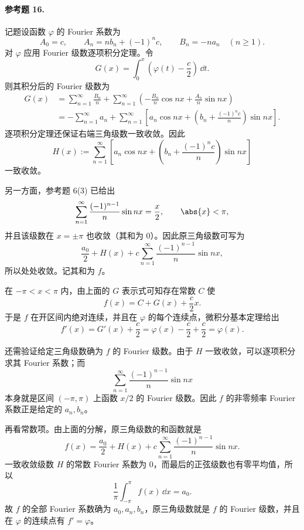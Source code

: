 \paragraph{参考题 16.}
\begin{xsolution}
记题设函数 $\varphi$ 的 Fourier 系数为
\[
  A_0=c,\qquad
  A_n=nb_n+(-1)^nc,\qquad
  B_n=-na_n\quad(n\ge1).
\]
对 $\varphi$ 应用 Fourier 级数逐项积分定理。令
\[
  G(x)=\int_0^x\left(\varphi(t)-\frac c2\right)\,\dd t.
\]
则其积分后的 Fourier 级数为
\begin{align*}
  G(x)
  &=\sum_{n=1}^{\infty}\frac{B_n}{n}
   +\sum_{n=1}^{\infty}
   \left(-\frac{B_n}{n}\cos nx+\frac{A_n}{n}\sin nx\right)\\
  &=-\sum_{n=1}^{\infty}a_n
   +\sum_{n=1}^{\infty}
   \left[a_n\cos nx+\left(b_n+\frac{(-1)^nc}{n}\right)\sin nx\right].
\end{align*}
逐项积分定理还保证右端三角级数一致收敛。因此
\[
  H(x):=\sum_{n=1}^{\infty}
  \left[a_n\cos nx+\left(b_n+\frac{(-1)^nc}{n}\right)\sin nx\right]
\]
一致收敛。

另一方面，参考题 6(3) 已给出
\[
  \sum_{n=1}^{\infty}\frac{(-1)^{n-1}}n\sin nx
  =\frac x2,
  \qquad\abs{x}<\pi,
\]
并且该级数在 $x=\pm\pi$ 也收敛（其和为 $0$）。因此原三角级数可写为
\[
  \frac{a_0}{2}+H(x)
  +c\sum_{n=1}^{\infty}\frac{(-1)^{n-1}}n\sin nx,
\]
所以处处收敛。记其和为 $f$。

在 $-\pi<x<\pi$ 内，由上面的 $G$ 表示式可知存在常数 $C$ 使
\[
  f(x)=C+G(x)+\frac c2x.
\]
于是 $f$ 在开区间内绝对连续，并且在 $\varphi$ 的每个连续点，微积分基本定理给出
\[
  f'(x)=G'(x)+\frac c2
  =\varphi(x)-\frac c2+\frac c2
  =\varphi(x).
\]

还需验证给定三角级数确为 $f$ 的 Fourier 级数。由于 $H$ 一致收敛，可以逐项积分求其 Fourier 系数；而
\[
  \sum_{n=1}^{\infty}\frac{(-1)^{n-1}}n\sin nx
\]
本身就是区间 $(-\pi,\pi)$ 上函数 $x/2$ 的 Fourier 级数。因此 $f$ 的非零频率 Fourier 系数正是给定的 $a_n,b_n$。

再看常数项。由上面的分解，原三角级数的和函数就是
\[
  f(x)=\frac{a_0}{2}+H(x)
  +c\sum_{n=1}^{\infty}\frac{(-1)^{n-1}}n\sin nx.
\]
一致收敛级数 $H$ 的常数 Fourier 系数为 $0$，而最后的正弦级数也有零平均值，所以
\[
  \frac1\pi\int_{-\pi}^{\pi}f(x)\,\dd x=a_0.
\]
故 $f$ 的全部 Fourier 系数确为 $a_0,a_n,b_n$，原三角级数就是 $f$ 的 Fourier 级数，并且在 $\varphi$ 的连续点有 $f'=\varphi$。
\end{xsolution}

